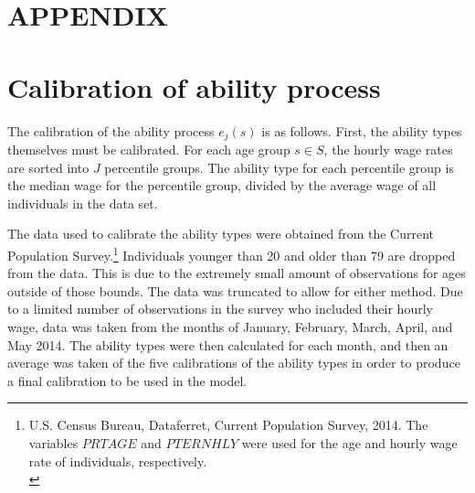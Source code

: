 \documentclass[letterpaper,12pt]{article}
\theoremstyle{definition}
\begin{document}
\begin{spacing}{1.5}


\clearpage
\end{spacing}

\newpage
\renewcommand{\theequation}{A.\arabic{section}.\arabic{equation}}
\renewcommand{\thesection}{A-\arabic{section}}   %
\setcounter{equation}{0}                         %
\setcounter{section}{0}                          %
\section*{APPENDIX}                              %

\section{Calibration of ability process}\label{AppAbilCalib}

  The calibration of the ability process $e_j(s)$ is as follows.  First, the ability types themselves must be calibrated. For each age group $s \in S$, the hourly wage rates are sorted into $J$ percentile groups.  The ability type for each percentile group is the median wage for the percentile group, divided by the average wage of all individuals in the data set.  

  The data used to calibrate the ability types were obtained from the Current Population Survey.\footnote{U.S. Census Bureau, Dataferret, Current Population Survey, 2014. The variables $PRTAGE$ and $PTERNHLY$ were used for the age and hourly wage rate of individuals, respectively. \\ [-2pt]} Individuals younger than 20 and older than 79 are dropped from the data. This is due to the extremely small amount of observations for ages outside of those bounds. The data was truncated to allow for either method. Due to a limited number of observations in the survey who included their hourly wage, data was taken from the months of January, February, March, April, and May 2014.  The ability types were then calculated for each month, and then an average was taken of the five calibrations of the ability types in order to produce a final calibration to be used in the model.
\end{document}
